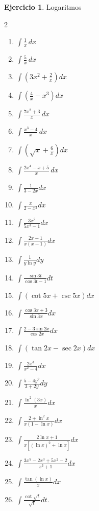 \documentclass[12pt]{article}
\theoremstyle{definition}
\newtheorem{Ejer}[teorema]{Ejercicio}
\theoremstyle{remark}
\begin{document}
\begin{Ejer}{Logaritmos}
\begin{multicols}{2}
\begin{enumerate}[resume=integrales]
\item $\displaystyle \int\frac{1}{x}\,dx$
\item $\displaystyle \int\frac{5}{x}\,dx$
\item $\displaystyle \int\left(3x^2+\frac{2}{x}\right)dx$
\item $\displaystyle \int\left(\frac{4}{x}-x^3\right)dx$
\item $\displaystyle \int\frac{7x^2+3}{x}\,dx$
\item $\displaystyle \int\frac{x^3-4}{x}\,dx$
\item $\displaystyle \int\left(\sqrt{x}+\frac{6}{x}\right)dx$
\item $\displaystyle \int\frac{2x^4-x+5}{x}\,dx$
\item $\int\frac1{3-2x}dx$ 
\item $\int\frac{x}{2-x^2}dx$ 
\item $\int\frac{3x^2}{5x^3-1}dx$ 
\item $\int\frac{2x-1}{x(x-1)}dx$
\item $\int\frac1{y\ln y}dy$ 
\item $\int\frac{\sin3t}{\cos3t-1}dt$ 
\item $\int(\cot5x+\csc5x)dx$ 
\item $\int\frac{\cos3x+3}{\sin3x}dx$
\item $\int\frac{2-3\sin2x}{\cos2x}dx$ 
\item $\int(\tan2x-\sec2x)dx$ 
\item $\int\frac{2x^3}{x^2-4}dx$ 
\item $\int\frac{5-4y^2}{3+2y}dy$
\item $\int\frac{\ln^2(3x)}x dx$ 
\item $\int\frac{2+\ln^2x}{x(1-\ln x)}dx$ 
\item $\int\frac{2\ln x+1}{x[(\ln x)^2+\ln x]}dx$ 
\item $\int\frac{3x^5-2x^3+5x^2-2}{x^3+1}dx$
\item $\int\frac{\tan(\ln x)}x dx$ 
\item $\int\frac{\cot\sqrt t}{\sqrt t}dt$.
\end{enumerate}
\end{multicols}
\end{Ejer}
\end{document}
